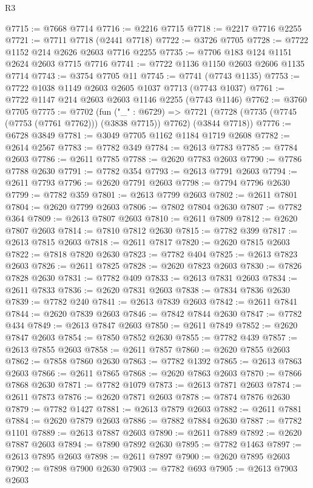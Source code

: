\begin{lexlean}{R3}
\begin{coremodule}
@7715 := @7668 @7714
@7716 := @2216 @7715
@7718 := @2217 @7716 @2255
@7721 := @7711 @7718 (@2441 @7718)
@7722 := @3726 @7705
@7728 := @7722 @1152 @214 @2626 @2603 @7716 @2255
@7735 := @7706 @183 @124 @1151 @2624 @2603 @7715 @7716
@7741 := @7722 @1136 @1150 @2603 @2606 @1135 @7714
@7743 := @3754 @7705 @11
@7745 := @7741 (@7743 @1135)
@7753 := @7722 @1038 @1149 @2603 @2605 @1037 @7713 (@7743 @1037)
@7761 := @7722 @1147 @214 @2603 @2603 @1146 @2255 (@7743 @1146)
@7762 := @3760 @7705
@7775 := @7702
    (fun ("_" : @6729) =>
    @7721 (@7728 (@7735 (@7745 (@7753 (@7761 @7762))) (@3838 @7715)) @7762) (@3844 @7718))
@7776 := @6728 @3849
@7781 := @3049 @7705 @1162 @1184 @1719 @2608
@7782 := @2614 @2567
@7783 := @7782 @349
@7784 := @2613 @7783
@7785 := @7784 @2603
@7786 := @2611 @7785
@7788 := @2620 @7783 @2603
@7790 := @7786 @7788 @2630
@7791 := @7782 @354
@7793 := @2613 @7791 @2603
@7794 := @2611 @7793
@7796 := @2620 @7791 @2603
@7798 := @7794 @7796 @2630
@7799 := @7782 @359
@7801 := @2613 @7799 @2603
@7802 := @2611 @7801
@7804 := @2620 @7799 @2603
@7806 := @7802 @7804 @2630
@7807 := @7782 @364
@7809 := @2613 @7807 @2603
@7810 := @2611 @7809
@7812 := @2620 @7807 @2603
@7814 := @7810 @7812 @2630
@7815 := @7782 @399
@7817 := @2613 @7815 @2603
@7818 := @2611 @7817
@7820 := @2620 @7815 @2603
@7822 := @7818 @7820 @2630
@7823 := @7782 @404
@7825 := @2613 @7823 @2603
@7826 := @2611 @7825
@7828 := @2620 @7823 @2603
@7830 := @7826 @7828 @2630
@7831 := @7782 @409
@7833 := @2613 @7831 @2603
@7834 := @2611 @7833
@7836 := @2620 @7831 @2603
@7838 := @7834 @7836 @2630
@7839 := @7782 @240
@7841 := @2613 @7839 @2603
@7842 := @2611 @7841
@7844 := @2620 @7839 @2603
@7846 := @7842 @7844 @2630
@7847 := @7782 @434
@7849 := @2613 @7847 @2603
@7850 := @2611 @7849
@7852 := @2620 @7847 @2603
@7854 := @7850 @7852 @2630
@7855 := @7782 @439
@7857 := @2613 @7855 @2603
@7858 := @2611 @7857
@7860 := @2620 @7855 @2603
@7862 := @7858 @7860 @2630
@7863 := @7782 @1392
@7865 := @2613 @7863 @2603
@7866 := @2611 @7865
@7868 := @2620 @7863 @2603
@7870 := @7866 @7868 @2630
@7871 := @7782 @1079
@7873 := @2613 @7871 @2603
@7874 := @2611 @7873
@7876 := @2620 @7871 @2603
@7878 := @7874 @7876 @2630
@7879 := @7782 @1427
@7881 := @2613 @7879 @2603
@7882 := @2611 @7881
@7884 := @2620 @7879 @2603
@7886 := @7882 @7884 @2630
@7887 := @7782 @1101
@7889 := @2613 @7887 @2603
@7890 := @2611 @7889
@7892 := @2620 @7887 @2603
@7894 := @7890 @7892 @2630
@7895 := @7782 @1463
@7897 := @2613 @7895 @2603
@7898 := @2611 @7897
@7900 := @2620 @7895 @2603
@7902 := @7898 @7900 @2630
@7903 := @7782 @693
@7905 := @2613 @7903 @2603

\end{coremodule}
\end{lexlean}
